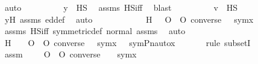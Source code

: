 \begin{isabellebody}
\ auto\isanewline
\ \ \ \ \ \ \isamarkupfalse%
\ \isamarkupfalse%
\ {\isachardoublequoteopen}y\ {\isasymin}\ HS{\isachardoublequoteclose}\ \isamarkupfalse%
\ assms{}\ HS{\isacharunderscore}{\kern0pt}iff\ \isamarkupfalse%
\ blast\isanewline
\ \ \ \ \ \ \isamarkupfalse%
\ \isamarkupfalse%
\ {\isachardoublequoteopen}v\ {\isasymin}\ HS{\isachardoublequoteclose}\ \isamarkupfalse%
\ yH\ assms{}\ ed{\isacharunderscore}{\kern0pt}def\ \isamarkupfalse%
\ auto\isanewline
\ \ \ \ \isamarkupfalse%
\isanewline
\isanewline
\ \ \ \ \isamarkupfalse%
\ \isamarkupfalse%
\ H{}{\isacharcolon}{\kern0pt}\ {\isachardoublequoteopen}{\isacharbraceleft}{\kern0pt}\ {\isasympi}\ O\ {\isasymtau}\ O\ converse{\isacharparenleft}{\kern0pt}{\isasympi}{\isacharparenright}{\kern0pt}{\isachardot}{\kern0pt}\ {\isasymtau}\ {\isasymin}\ sym{\isacharparenleft}{\kern0pt}x{\isacharparenright}{\kern0pt}\ {\isacharbraceright}{\kern0pt}\ {\isasymin}\ {\isasymF}{\isachardoublequoteclose}\ \isanewline
\ \ \ \ \ \ \isamarkupfalse%
\ assms{}\ HS{\isacharunderscore}{\kern0pt}iff\ symmetric{\isacharunderscore}{\kern0pt}def\ {\isasymF}{\isacharunderscore}{\kern0pt}normal\ assms\ \isamarkupfalse%
\ auto\ \isanewline
\isanewline
\ \ \ \ \isamarkupfalse%
\ H{}\ {\isacharcolon}{\kern0pt}\ {\isachardoublequoteopen}{\isacharbraceleft}{\kern0pt}\ {\isasympi}\ O\ {\isasymtau}\ O\ converse{\isacharparenleft}{\kern0pt}{\isasympi}{\isacharparenright}{\kern0pt}{\isachardot}{\kern0pt}\ {\isasymtau}\ {\isasymin}\ sym{\isacharparenleft}{\kern0pt}x{\isacharparenright}{\kern0pt}\ {\isacharbraceright}{\kern0pt}\ {\isasymsubseteq}\ sym{\isacharparenleft}{\kern0pt}Pn{\isacharunderscore}{\kern0pt}auto{\isacharparenleft}{\kern0pt}{\isasympi}{\isacharparenright}{\kern0pt}{\isacharbackquote}{\kern0pt}x{\isacharparenright}{\kern0pt}{\isachardoublequoteclose}\ \isanewline
\ \ \ \ \isamarkupfalse%
\ {\isacharparenleft}{\kern0pt}rule\ subsetI{\isacharparenright}{\kern0pt}\ \isanewline
\ \ \ \ \ \ \isamarkupfalse%
\ {\isasymsigma}\ \isamarkupfalse%
\ assm\ {\isacharcolon}{\kern0pt}\ {\isachardoublequoteopen}{\isasymsigma}\ {\isasymin}\ {\isacharbraceleft}{\kern0pt}{\isasympi}\ O\ {\isasymtau}\ O\ converse{\isacharparenleft}{\kern0pt}{\isasympi}{\isacharparenright}{\kern0pt}\ {\isachardot}{\kern0pt}\ {\isasymtau}\ {\isasymin}\ sym{\isacharparenleft}{\kern0pt}x{\isacharparenright}{\kern0pt}{\isacharbraceright}{\kern0pt}{\isachardoublequoteclose}\isanewline

\end{isabellebody}
